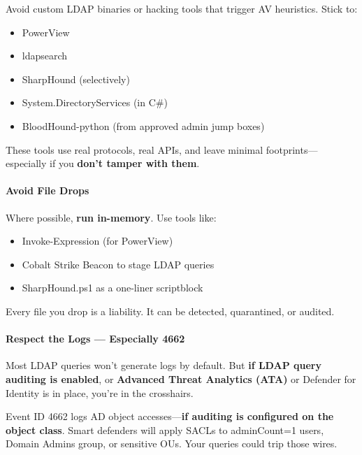 Avoid custom LDAP binaries or hacking tools that trigger AV heuristics. Stick to:

\begin{itemize}
    \item PowerView

    \item ldapsearch

    \item SharpHound (selectively)

    \item System.DirectoryServices (in C\#)

    \item BloodHound-python (from approved admin jump boxes)

\end{itemize}
These tools use real protocols, real APIs, and leave minimal footprints—especially if you \textbf{don’t tamper with them}.

\paragraph{\textbf{   Avoid File Drops}}

Where possible, \textbf{run in-memory}. Use tools like:

\begin{itemize}
    \item Invoke-Expression (for PowerView)

    \item Cobalt Strike Beacon to stage LDAP queries

    \item SharpHound.ps1 as a one-liner scriptblock

\end{itemize}
Every file you drop is a liability. It can be detected, quarantined, or audited.

\paragraph{\textbf{   Respect the Logs — Especially 4662}}

Most LDAP queries won’t generate logs by default. But \textbf{if LDAP query auditing is enabled}, or \textbf{Advanced Threat Analytics (ATA)} or Defender for Identity is in place, you’re in the crosshairs.

Event ID 4662 logs AD object accesses—\textbf{if auditing is configured on the object class}. Smart defenders will apply SACLs to adminCount=1 users, Domain Admins group, or sensitive OUs. Your queries could trip those wires.

